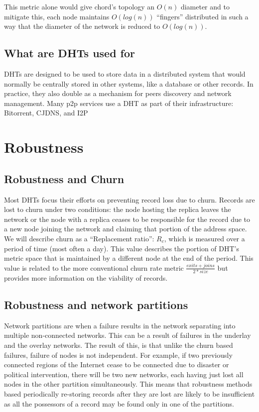 \documentclass[conference]{IEEEtran}
\begin{document}
This metric alone would give chord's topology an $O(n)$ diameter 
and to mitigate this, each node maintains $O(log(n))$ ``fingers''
 distributed in such a way that the diameter of the network is reduced to $O(log(n))$.

\subsection{What are DHTs used for}

DHTs are designed to be used to store data in a distributed system that would normally be centrally stored in other systems, like a database or other records.
In practice, they also double as a mechanism for peers discovery and network management.
Many p2p services use a DHT as part of their infrastructure: Bitorrent\cite{jimenez2011kademlia}, CJDNS\cite{hodson2013meshnet}, and I2P\cite{zantout2011i2p}

\section{Robustness}

\subsection{Robustness and Churn}
Most DHTs focus their efforts on preventing record loss due to churn.
Records are lost to churn under two conditions: the node hosting the replica leaves the network or the node with a replica ceases to be responsible for the record due to a new node joining the network and claiming that portion of the address space. 
We will describe churn as a ``Replacement ratio'': $R_{c}$, which is measured over a period of time (most often a day).
This value describes the portion of DHT's metric space that is maintained by a different node at the end of the period.
This value is related to the more conventional churn rate metric $\frac{exits + joins}{2*size}$ but provides more information on the viability of records.

\subsection{Robustness and network partitions}
Network partitions are when a failure results in the network separating into multiple non-connected networks.
This can be a result of failures in the underlay and the overlay networks.
The result of this, is that unlike the churn based failures, failure of nodes is not independent.
For example, if two previously connected regions of the Internet cease to be connected due to disaster or political intervention, there will be two new networks, each having just lost all nodes in the other partition simultaneously.
This means that robustness methods based periodically re-storing records after they are lost are likely to be insufficient as all the possessors of a record may be found only in one of the partitions.
\end{document}
